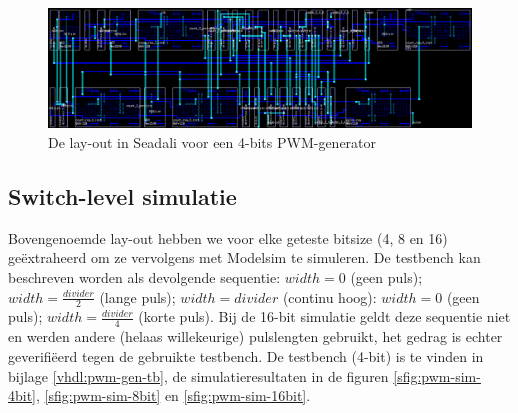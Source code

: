 \documentclass{article}
\begin{document}
\begin{figure}[H]
	\centering
	\includegraphics[width=\textwidth]{resource/pwm_gen_layout.png}
	\caption{De lay-out in Seadali voor een 4-bits PWM-generator}
	\label{fig:pwm-layout}
\end{figure}

\subsection{Switch-level simulatie}
\label{ssec:pwm-impl-switch}
Bovengenoemde lay-out hebben we voor elke geteste bitsize (4, 8 en 16) geëxtraheerd om ze vervolgens met Modelsim te simuleren. De testbench kan beschreven worden als devolgende sequentie: $width = 0$ (geen puls); $width = \frac{divider}{2}$ (lange puls); $width = divider$ (continu hoog): $width = 0$ (geen puls); $width = \frac{divider}{4}$ (korte puls). Bij de 16-bit simulatie geldt deze sequentie niet en werden andere (helaas willekeurige) pulslengten gebruikt, het gedrag is echter geverifiëerd tegen de gebruikte testbench.
De testbench (4-bit) is te vinden in bijlage \ref{vhdl:pwm-gen-tb}, de simulatieresultaten in de figuren \ref{sfig:pwm-sim-4bit}, \ref{sfig:pwm-sim-8bit} en \ref{sfig:pwm-sim-16bit}.
\end{document}
